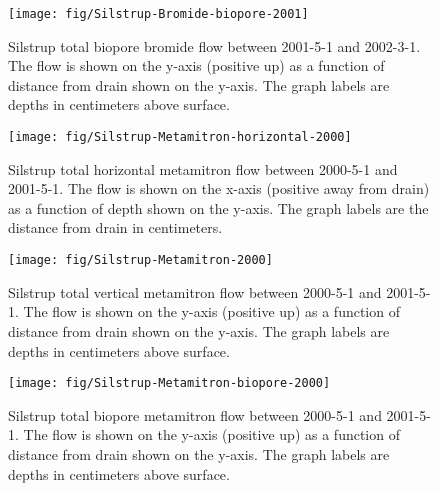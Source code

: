 \begin{figure}[htbp]
  \centering
  \texttt{[image: fig/Silstrup-Bromide-biopore-2001]}
  
  \caption{Silstrup total biopore bromide flow between 2001-5-1 and
    2002-3-1.  The flow is shown on the y-axis (positive up) as a
    function of distance from drain shown on the y-axis.  The graph
    labels are depths in centimeters above surface.}
  \label{fig:Silstrup-Bromide-biopore-2001}
\end{figure}\FloatBarrier

\begin{figure}[htbp]
  \centering
  \texttt{[image: fig/Silstrup-Metamitron-horizontal-2000]}
  
  \caption{Silstrup total horizontal metamitron flow between 2000-5-1 and
    2001-5-1.  The flow is shown on the x-axis (positive away from
    drain) as a function of depth shown on the y-axis.  The graph
    labels are the distance from drain in centimeters.}
  \label{fig:Silstrup-Metamitron-2000-horizontal}
\end{figure}\FloatBarrier

\begin{figure}[htbp]
  \centering
  \texttt{[image: fig/Silstrup-Metamitron-2000]}
  
  \caption{Silstrup total vertical metamitron flow between 2000-5-1 and
    2001-5-1.  The flow is shown on the y-axis (positive up) as a
    function of distance from drain shown on the y-axis.  The graph
    labels are depths in centimeters above surface.}
  \label{fig:Silstrup-Metamitron-2000-vertical}
\end{figure}\FloatBarrier

\begin{figure}[htbp]
  \centering
  \texttt{[image: fig/Silstrup-Metamitron-biopore-2000]}
  
  \caption{Silstrup total biopore metamitron flow between 2000-5-1 and
    2001-5-1.  The flow is shown on the y-axis (positive up) as a
    function of distance from drain shown on the y-axis.  The graph
    labels are depths in centimeters above surface.}
  \label{fig:Silstrup-Metamitron-biopore-2000}
\end{figure}\FloatBarrier

